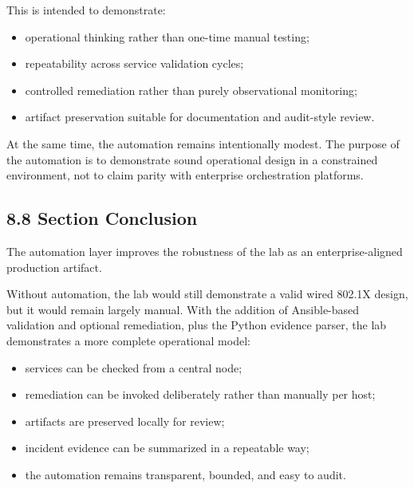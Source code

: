 \documentclass[11pt]{article}
\begin{document}
This is intended to demonstrate:

\begin{itemize}
    \item operational thinking rather than one-time manual testing;
    \item repeatability across service validation cycles;
    \item controlled remediation rather than purely observational monitoring;
    \item artifact preservation suitable for documentation and audit-style review.
\end{itemize}

At the same time, the automation remains intentionally modest. The purpose of the automation is to demonstrate sound operational design in a constrained environment, not to claim parity with enterprise orchestration platforms.


\subsection{8.8 Section Conclusion}
\label{sec:section-8-conclusion}

The automation layer improves the robustness of the lab as an enterprise-aligned production artifact.

Without automation, the lab would still demonstrate a valid wired 802.1X design, but it would remain largely manual. With the addition of Ansible-based validation and optional remediation, plus the Python evidence parser, the lab demonstrates a more complete operational model:

\begin{itemize}
    \item services can be checked from a central node;
    \item remediation can be invoked deliberately rather than manually per host;
    \item artifacts are preserved locally for review;
    \item incident evidence can be summarized in a repeatable way;
    \item the automation remains transparent, bounded, and easy to audit.
\end{itemize}
\end{document}

